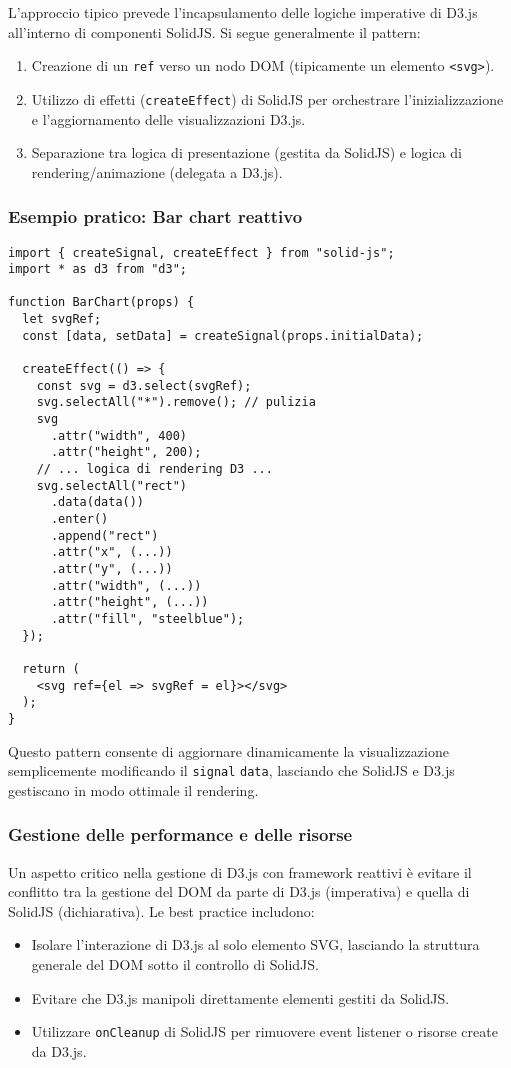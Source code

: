 L’approccio tipico prevede l’incapsulamento delle logiche imperative di D3.js all’interno di componenti SolidJS. Si segue generalmente il pattern:
\begin{enumerate}
    \item Creazione di un \texttt{ref} verso un nodo DOM (tipicamente un elemento \texttt{<svg>}).
    \item Utilizzo di effetti (\texttt{createEffect}) di SolidJS per orchestrare l’inizializzazione e l’aggiornamento delle visualizzazioni D3.js.
    \item Separazione tra logica di presentazione (gestita da SolidJS) e logica di rendering/animazione (delegata a D3.js).
\end{enumerate}

\subsubsection{Esempio pratico: Bar chart reattivo}

\begin{verbatim}
import { createSignal, createEffect } from "solid-js";
import * as d3 from "d3";

function BarChart(props) {
  let svgRef;
  const [data, setData] = createSignal(props.initialData);

  createEffect(() => {
    const svg = d3.select(svgRef);
    svg.selectAll("*").remove(); // pulizia
    svg
      .attr("width", 400)
      .attr("height", 200);
    // ... logica di rendering D3 ...
    svg.selectAll("rect")
      .data(data())
      .enter()
      .append("rect")
      .attr("x", (...))
      .attr("y", (...))
      .attr("width", (...))
      .attr("height", (...))
      .attr("fill", "steelblue");
  });

  return (
    <svg ref={el => svgRef = el}></svg>
  );
}
\end{verbatim}
Questo pattern consente di aggiornare dinamicamente la visualizzazione semplicemente modificando il \texttt{signal} \texttt{data}, lasciando che SolidJS e D3.js gestiscano in modo ottimale il rendering.

\subsubsection{Gestione delle performance e delle risorse}

Un aspetto critico nella gestione di D3.js con framework reattivi è evitare il conflitto tra la gestione del DOM da parte di D3.js (imperativa) e quella di SolidJS (dichiarativa). Le best practice includono:
\begin{itemize}
    \item Isolare l’interazione di D3.js al solo elemento SVG, lasciando la struttura generale del DOM sotto il controllo di SolidJS.
    \item Evitare che D3.js manipoli direttamente elementi gestiti da SolidJS.
    \item Utilizzare \texttt{onCleanup} di SolidJS per rimuovere event listener o risorse create da D3.js.
\end{itemize}

